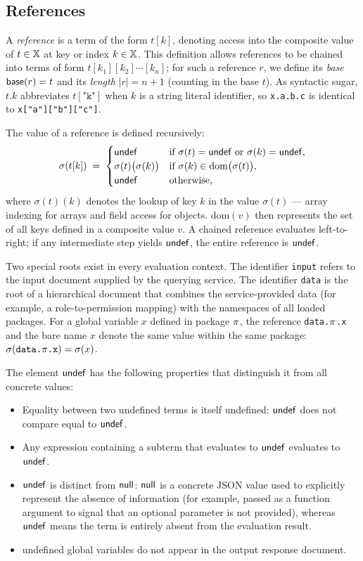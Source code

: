 
\subsection{References}
\label{ss:ref}


A \emph{reference} is a term of the form $t[k]$, denoting access into the composite value of $t \in \mathbb{X}$ at key or index $k \in \mathbb{X}$.
This definition allows references to be chained into terms of form $t[k_1][k_2]\cdots[k_n]$; for such a reference $r$, we define its \emph{base} $\mathsf{base}(r) = t$ and its \emph{length} $|r| = n+1$ (counting in the base $t$).
As syntactic sugar, $t\texttt{.}k$ abbreviates $t[\texttt{"k"}]$ when $k$ is a string literal identifier, so \texttt{x.a.b.c} is identical to \texttt{x["a"]["b"]["c"]}.

The value of a reference is defined recursively:
\[
\sigma(t[k]) \;=\;
\begin{cases}
  \mathsf{undef} & \text{if } \sigma(t) = \mathsf{undef} \text{ or } \sigma(k) = \mathsf{undef}, \\
  \sigma(t)\bigl(\sigma(k)\bigr) & \text{if } \sigma(k) \in \mathrm{dom}\bigl(\sigma(t)\bigr), \\
  \mathsf{undef} & \text{otherwise,}
\end{cases}
\]
where $\sigma(t)(k)$ denotes the lookup of key $k$ in the value $\sigma(t)$ — array indexing for arrays and field access for objects.
$\mathrm{dom}(v)$ then represents the set of all keys defined in a composite value $v$.
A chained reference evaluates left-to-right; if any intermediate step yields $\mathsf{undef}$, the entire reference is $\mathsf{undef}$.

Two special roots exist in every evaluation context.
The identifier \texttt{input} refers to the input document supplied by the querying service.
The identifier \texttt{data} is the root of a hierarchical document that combines the service-provided data (for example, a role-to-permission mapping) with the namespaces of all loaded \rego packages.
For a global variable $x$ defined in package $\pi$, the reference \texttt{data.$\pi$.x} and the bare name $x$ denote the same value within the same package: $\sigma(\texttt{data.\textit{$\pi$}.x}) = \sigma(x)$.

The element $\mathsf{undef}$ has the following properties that distinguish it from all concrete values:
\begin{itemize}
  \item Equality between two undefined terms is itself undefined: $\mathsf{undef}$ does not compare equal to $\mathsf{undef}$.
  \item Any expression containing a subterm that evaluates to $\mathsf{undef}$ evaluates to $\mathsf{undef}$.
  \item $\mathsf{undef}$ is distinct from $\mathsf{null}$: $\mathsf{null}$ is a concrete JSON value used to explicitly represent the absence of information (for example, passed as a function argument to signal that an optional parameter is not provided), whereas $\mathsf{undef}$ means the term is entirely absent from the evaluation result.
  \item undefined global variables do not appear in the output response document.
\end{itemize}

